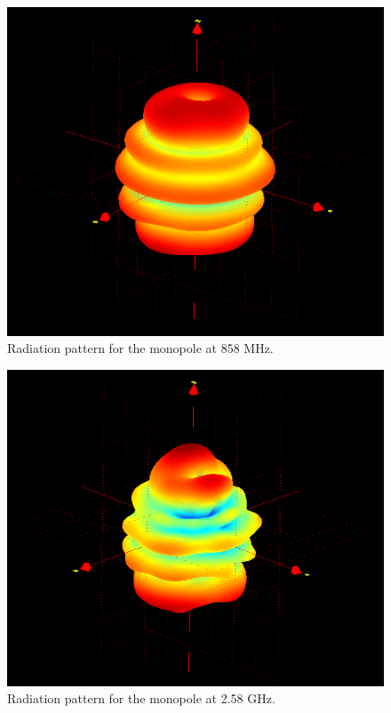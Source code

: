 \begin{minipage}{0.48\textwidth}
\begin{figure}[H]
\centering
\includegraphics[width=1\textwidth]{figure/MonoStor2500.png}
\caption{Radiation pattern for the monopole at 858 MHz.}
\label{fig:Mono856}
\end{figure}
\end{minipage}
\hspace{0.02\textwidth}
\begin{minipage}{0.48\textwidth}
\begin{figure}[H]
\centering
\includegraphics[width=1\textwidth]{figure/MonoLille2500.png}
\caption{Radiation pattern for the monopole at 2.58 GHz.}
\label{fig:Mono2580}
\end{figure}
\end{minipage}


